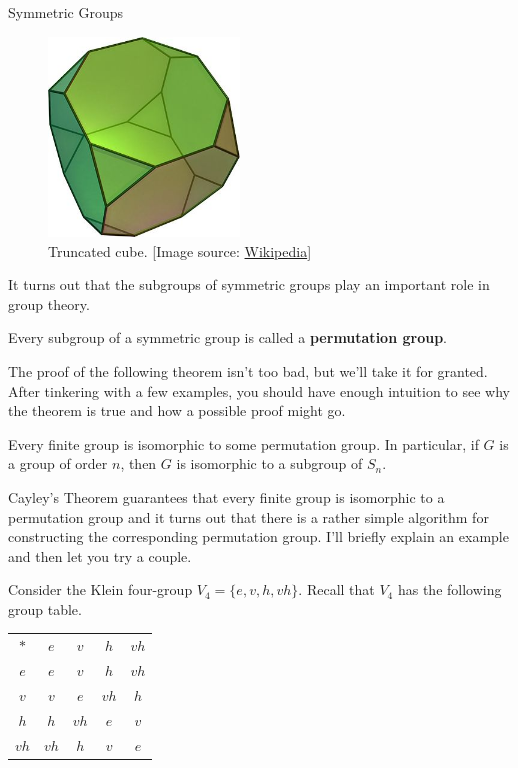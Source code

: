 \begin{section}{Symmetric Groups}
\begin{figure}[ht!]
\begin{center}
\includegraphics[width=2in]{TruncatedCube.jpg}
\end{center}
\caption{Truncated cube. [Image source: \href{https://en.wikipedia.org/wiki/Truncated_cube}{Wikipedia}]}\label{fig:TruncatedCube}
\end{figure}

It turns out that the subgroups of symmetric groups play an important role in group theory.

\begin{definition}
Every subgroup of a symmetric group is called a \textbf{permutation group}.
\end{definition}

The proof of the following theorem isn't too bad, but we'll take it for granted. After tinkering with a few examples, you should have enough intuition to see why the theorem is true and how a possible proof might go.

\begin{theorem}
Every finite group is isomorphic to some permutation group.  In particular, if $G$ is a group of order $n$, then $G$ is isomorphic to a subgroup of $S_n$.
\end{theorem}

Cayley's Theorem guarantees that every finite group is isomorphic to a permutation group and it turns out that there is a rather simple algorithm for constructing the corresponding permutation group.  I'll briefly explain an example and then let you try a couple.

Consider the Klein four-group $V_4=\{e,v,h,vh\}$.  Recall that $V_4$ has the following group table.

\begin{center}
\begin{tabular}{c!{\vrule width 2pt}c|c|c|c}
$*$ & $e$ & $v$ & $h$ & $vh$ \\ 
$e$ & $e$ & $v$ & $h$ & $vh$ \\
\hline $v$ & $v$ & $e$ & $vh$ & $h$  \\
\hline $h$ & $h$ & $vh$ & $e$ & $v$\\
\hline $vh$ & $vh$ & $h$ & $v$ & $e$
\end{tabular}
\end{center}


\end{section}
